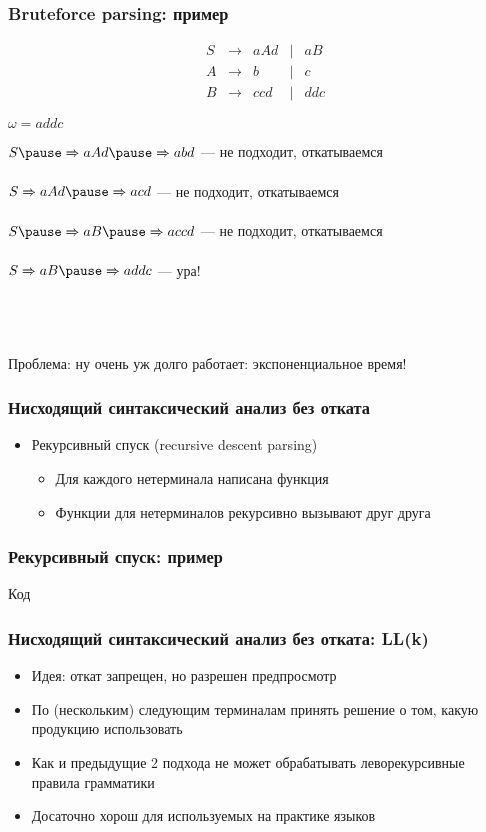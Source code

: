 \documentclass{beamer}
\newcommand{\derives}[0]{\xRightarrow[]{}}
\begin{document}
\begin{frame}[fragile]
  \transwipe[direction=90]
  \frametitle{Bruteforce parsing: пример}

  $$
  \begin{array}{crcccl}
  &S& \rightarrow & a A d & | & a B \\
  &A& \rightarrow & b     & | & c \\
  &B& \rightarrow & c c d & | & d d c
  \end{array}
  $$
  
  $\omega = a d d c$ \pause 
  
  $S \pause \derives a A d \pause \derives a b d$ \pause --- не подходит, откатываемся \pause 
  
  $S \derives a A d \pause \derives a c d$ \pause --- не подходит, откатываемся \pause 
  
  $S \pause \derives a B \pause \derives a c c d$ \pause --- не подходит, откатываемся \pause 
  
  $S \derives a B \pause \derives a d d c$ \pause --- ура!
  
  ~\\~
  
  Проблема: ну очень уж долго работает: экспоненциальное время!
\end{frame}

\begin{frame}[fragile]
  \transwipe[direction=90]
  \frametitle{Нисходящий синтаксический анализ без отката}
  \begin{itemize}
    \item Рекурсивный спуск (recursive descent parsing)
    \begin{itemize}
      \item Для каждого нетерминала написана функция
      \item Функции для нетерминалов рекурсивно вызывают друг друга
    \end{itemize}
  \end{itemize}
\end{frame}

\begin{frame}[fragile]
  \transwipe[direction=90]
  \frametitle{Рекурсивный спуск: пример}
  Код
\end{frame}

\begin{frame}[fragile]
  \transwipe[direction=90]
  \frametitle{Нисходящий синтаксический анализ без отката: LL(k)}
  \begin{itemize}
    \item Идея: откат запрещен, но разрешен предпросмотр
    \item По (нескольким) следующим терминалам принять решение о том, какую продукцию использовать
    \item Как и предыдущие 2 подхода не может обрабатывать леворекурсивные правила грамматики
    \item Досаточно хорош для используемых на практике языков
  \end{itemize}
\end{frame}
\end{document}
